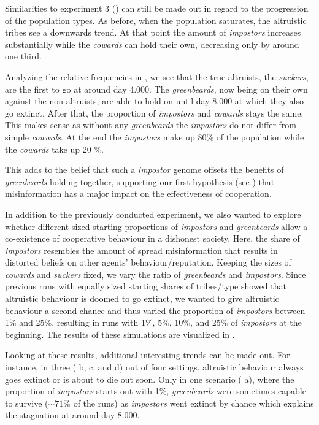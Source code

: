 \documentclass[sigconf]{acmart}
\newcommand{\cowards}{\textit{cowards}\xspace}
\newcommand{\suckers}{\textit{suckers}\xspace}
\newcommand{\impostors}{\textit{impostors}\xspace}
\newcommand{\impostor}{\textit{impostor}\xspace}
\newcommand{\greenbeards}{\textit{greenbeards}\xspace}
\begin{document}
    Similarities to experiment 3 () can still be made out in regard to the progression of the population types.
    As before, when the population saturates, the altruistic tribes see a downwards trend.
    At that point the amount of \impostors increases substantially while the \cowards can hold their own, decreasing only by around one third.

    Analyzing the relative frequencies in , we see that the true altruists, the \suckers, are the first to go at around day 4.000.
    The \greenbeards, now being on their own against the non-altruists, are able to hold on until day 8.000 at which they also go extinct.
    After that, the proportion of \impostors and \cowards stays the same.
    This makes sense as without any \greenbeards the \impostors do not differ from simple \cowards.
    At the end the \impostors make up 80\% of the population while the \cowards take up 20 \%.

    This adds to the belief that such a \impostor genome offsets the benefits of \greenbeards holding together, supporting our first hypothesis (see ) that misinformation has a major impact on the effectiveness of cooperation.

    In addition to the previously conducted experiment, we also wanted to explore whether different sized starting proportions of \impostors and \greenbeards allow a co-existence of cooperative behaviour in a dishonest society.
    Here, the share of \impostors resembles the amount of spread misinformation that results in distorted beliefs on other agents' behaviour/reputation.
    Keeping the sizes of \cowards and \suckers fixed, we vary the ratio of \greenbeards and \impostors.
    Since previous runs with equally sized starting shares of tribes/type showed that altruistic behaviour is doomed to go extinct, we wanted to give altruistic behaviour a second chance and thus varied the proportion of \impostors between 1\% and 25\%, resulting in runs with 1\%, 5\%, 10\%, and 25\% of \impostors at the beginning.
    The results of these simulations are visualized in .

    Looking at these results, additional interesting trends can be made out.
    For instance, in three ( b, c, and d) out of four settings, altruistic behaviour always goes extinct or is about to die out soon.
    Only in one scenario ( a), where the proportion of \impostors starts out with 1\%, \greenbeards were sometimes capable to survive ($\sim 71\%$ of the runs) as \impostors went extinct by chance which explains the stagnation at around day 8.000.
\end{document}
